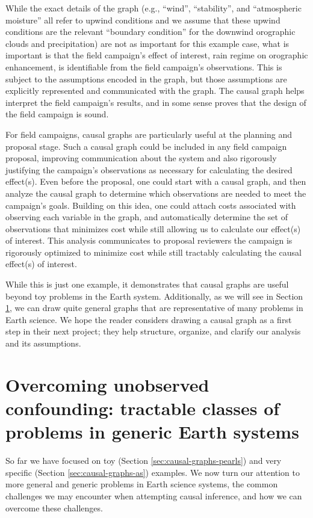 \documentclass[12pt]{article}
\begin{document}
While the exact details of the graph (e.g., ``wind'', ``stability'',
and ``atmospheric moisture'' all refer to upwind conditions and we
assume that these upwind conditions are the relevant ``boundary
condition'' for the downwind orographic clouds and precipitation) are
not as important for this example case, what is important is that the
field campaign's effect of interest, rain regime on orographic
enhancement, is identifiable from the field campaign's
observations. This is subject to the assumptions encoded in the graph,
but those assumptions are explicitly represented and communicated with
the graph. The causal graph helps interpret the field campaign's
results, and in some sense proves that the design of the field
campaign is sound.

For field campaigns, causal graphs are particularly useful at the
planning and proposal stage. Such a causal graph could be included in
any field campaign proposal, improving communication about the system
and also rigorously justifying the campaign’s observations as
necessary for calculating the desired effect(s). Even before the
proposal, one could start with a causal graph, and then analyze the
causal graph to determine which observations are needed to meet the
campaign’s goals. Building on this idea, one could attach costs
associated with observing each variable in the graph, and
automatically determine the set of observations that minimizes cost
while still allowing us to calculate our effect(s) of interest. This
analysis communicates to proposal reviewers the campaign is rigorously
optimized to minimize cost while still tractably calculating the
causal effect(s) of interest.

While this is just one example, it demonstrates that causal graphs are
useful beyond toy problems in the Earth system. Additionally, as we
will see in Section \ref{sec:necess-cond-caus}, we can draw quite
general graphs that are representative of many problems in Earth
science. We hope the reader considers drawing a causal graph as a
first step in their next project; they help structure, organize, and
clarify our analysis and its assumptions.


\section{Overcoming unobserved confounding: tractable classes of
  problems in generic Earth systems}
\label{sec:necess-cond-caus}

So far we have focused on toy (Section \ref{sec:causal-graphs-pearls})
and very specific (Section \ref{sec:causal-graphs-as}) examples. We
now turn our attention to more general and generic problems in Earth
science systems, the common challenges we may encounter when
attempting causal inference, and how we can overcome these challenges.
\end{document}
